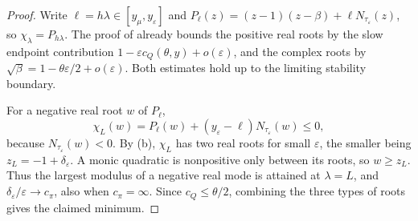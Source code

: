 \documentclass[11pt]{article}
\theoremstyle{definition}
\theoremstyle{remark}
\newcommand{\cQ}{c_{Q}}
\newcommand{\cpi}{c_{\pi}}
\begin{document}
\begin{proof}
Write \(\ell=h\lambda\in[y_\mu,y_\varepsilon]\) and
\(P_\ell(z)=(z-1)(z-\beta)+\ell N_{\tau_\varepsilon}(z)\), so
\(\chi_\lambda=P_{h\lambda}\).
The proof of  already bounds the positive real roots by
the slow endpoint contribution
\(1-\varepsilon\cQ(\theta,y)+o(\varepsilon)\), and the complex
roots by \(\sqrt\beta=1-\theta\varepsilon/2+o(\varepsilon)\).
Both estimates hold up to the limiting stability boundary.

For a negative real root \(w\) of \(P_\ell\),
\[
\chi_L(w)=P_\ell(w)+(y_\varepsilon-\ell)N_{\tau_\varepsilon}(w)
\le0,
\]
because \(N_{\tau_\varepsilon}(w)<0\).
By (b), \(\chi_L\) has two real roots for small
\(\varepsilon\), the smaller being
\(z_L=-1+\delta_\varepsilon\).  A monic quadratic is nonpositive
only between its roots, so \(w\ge z_L\).
Thus the largest modulus of a negative real mode is attained at
\(\lambda=L\), and
\(\delta_\varepsilon/\varepsilon\to\cpi\), also when
\(\cpi=\infty\).  Since \(\cQ\le\theta/2\), combining the three
types of roots gives the claimed minimum.
\end{proof}
\end{document}
